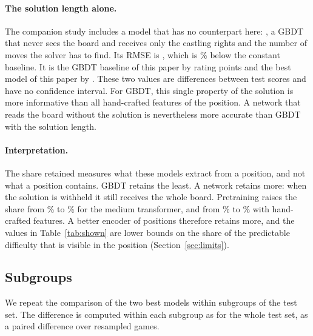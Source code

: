 \documentclass[11pt]{article}
\begin{document}
\paragraph{The solution length alone.}
The companion study includes a model that has no counterpart here:
, a GBDT that never sees the board and
receives only the castling rights and the number of moves the solver has to
find. Its RMSE is , which is
\% below the constant baseline. It is
 the GBDT baseline of this paper by
 rating points and
 the best model of this paper by
. These two values are differences
between test scores and have no confidence interval. For GBDT, this single
property of the solution is more informative than all 
hand-crafted features of the position. A network that reads the board
without the solution is nevertheless more accurate than GBDT with the
solution length.

\paragraph{Interpretation.}
The share retained measures what these models extract from a position, and
not what a position contains. GBDT retains the least. A network retains more:
when the solution is withheld it still receives the whole board. Pretraining
raises the share from \% to
\% for the medium
transformer, and from \% to
\% with hand-crafted
features. A better encoder of positions therefore retains more, and the
values in Table~\ref{tab:shown} are lower bounds on the share of the
predictable difficulty that is visible in the position
(Section~\ref{sec:limits}).

\ifshownpaired
\subsection{Subgroups}

We repeat the comparison of the two best models within subgroups of the test
set. The difference is computed within each subgroup as for the whole test
set, as a paired difference over resampled games.
\end{document}
